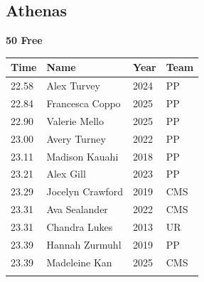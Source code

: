 
\clearpage
{}

\clearpage
\subsection{Athenas}
\vspace{1.2em}
\noindent\begin{minipage}[t]{0.98\textwidth}
\centering
\textbf{\textcolor{teamprimary}{50 Free}}\par
\vspace{0.5em}
\centering
\small
\renewcommand{\arraystretch}{1.0}
\setlength{\tabcolsep}{4pt}
\begin{tabular}{@{}p{2.5cm}p{4.5cm}p{1.5cm}p{2.5cm}@{}}
\toprule
\textbf{Time} & \textbf{Name} & \textbf{Year} & \textbf{Team} \\
\midrule
22.58 & Alex Turvey & 2024 & PP \\
22.84 & Francesca Coppo & 2025 & PP \\
22.90 & Valerie Mello & 2025 & PP \\
23.00 & Avery Turney & 2022 & PP \\
23.11 & Madison Kauahi & 2018 & PP \\
23.21 & Alex Gill & 2023 & PP \\
23.29 & Jocelyn Crawford & 2019 & CMS \\
23.31 & Ava Sealander & 2022 & CMS \\
23.31 & Chandra Lukes & 2013 & UR \\
23.39 & Hannah Zurmuhl & 2019 & PP \\
23.39 & Madeleine Kan & 2025 & CMS \\
\bottomrule
\vspace{0.5em}
\end{tabular}
\end{minipage}
\vspace{1.2em}
